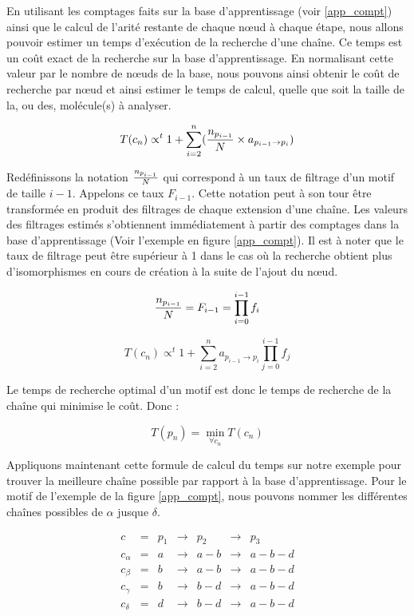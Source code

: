 En utilisant les comptages faits sur la base d'apprentissage (voir \ref{app_compt}) ainsi que le calcul de l'arité restante de chaque n\oe{}ud à chaque étape, nous allons pouvoir estimer un temps d'exécution de la recherche d'une chaîne.
Ce temps est un coût exact de la recherche sur la base d'apprentissage.
En normalisant cette valeur par le nombre de n\oe{}uds de la base, nous pouvons ainsi obtenir le coût de recherche par n\oe{}ud et ainsi estimer le temps de calcul, quelle que soit la taille de la, ou des, molécule(s) à analyser.

\begin{equation}
 T(c_n) \propto^t 1 + \sum_{i=2}^n ({n_{p_{i-1}} \over N} \times a_{p_{i-1} \rightarrow p_i})
\end{equation}

Redéfinissons la notation ${n_{p_{i-1}} \over N}$ qui correspond à un taux de filtrage d'un motif de taille $i-1$.
Appelons ce taux $F_{i-1}$. Cette notation peut à son tour être transformée en
produit des filtrages de chaque extension d'une chaîne. Les valeurs des filtrages estimés s'obtiennent immédiatement à partir des
comptages dans la base d'apprentissage (Voir l'exemple en figure \ref{app_compt}).
Il est à noter que le taux de filtrage peut être supérieur à 1 dans le cas où la recherche obtient plus d'isomorphismes en cours de création à la suite de l'ajout du n\oe{}ud.

\begin{equation}
 {n_{p_{i-1}} \over N} = F_{i-1} = \prod_{i=0}^{i-1} f_i
\end{equation}

\begin{equation}
 T(c_n) \propto^t 1 + \sum_{i=2}^n a_{p_{i-1} \rightarrow p_i} \prod_{j=0}^{i-1} f_j
\end{equation}

Le temps de recherche optimal d'un motif est donc le temps de recherche de la chaîne qui minimise le coût. Donc :

\begin{equation}
 T(p_n) = \min_{\forall c_n} T(c_n)
\end{equation}


Appliquons maintenant cette formule de calcul du temps sur notre exemple pour trouver la meilleure chaîne possible par
rapport à la base d'apprentissage. Pour le motif de l'exemple de la figure \ref{app_compt}, nous pouvons nommer les différentes chaînes possibles de $\alpha$
jusque $\delta$.

\[
\begin{array}{ccccccc}
 c         & = & p_1 & \rightarrow & p_2     & \rightarrow & p_3 \\
 c_\alpha  & = & a   & \rightarrow & a\!-\!b & \rightarrow & a\!-\!b\!-\!d \\
 c_\beta   & = & b   & \rightarrow & a\!-\!b & \rightarrow & a\!-\!b\!-\!d \\
 c_\gamma  & = & b   & \rightarrow & b\!-\!d & \rightarrow & a\!-\!b\!-\!d \\
 c_\delta  & = & d   & \rightarrow & b\!-\!d & \rightarrow & a\!-\!b\!-\!d \\
\end{array}
\]

